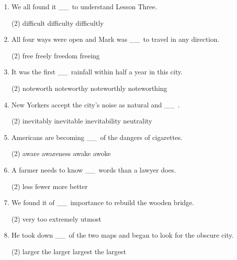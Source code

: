 \documentclass{yufa}
\newcommand\ttu{ \_\_\ }
\begin{document}
\begin{enumerate}
\item We all found it \ttu to understand Lesson Three.
  \begin{tasks}(2)
    \task difficult
    \task difficulty
    \task difficultly
  \end{tasks}

\item All four ways were open and Mark was \ttu to travel in any direction.
  \begin{tasks}(2)
    \task free
    \task freely
    \task freedom
    \task freeing
  \end{tasks}

\item It was the first \ttu rainfall within half a year in this city.
  \begin{tasks}(2)
    \task noteworth
    \task noteworthy
    \task noteworthly
    \task noteworthing
  \end{tasks}

\item New Yorkers accept the city's noise as natural and \ttu.
  \begin{tasks}(2)
    \task inevitably
    \task inevitable
    \task inevitability
    \task neutrality
  \end{tasks}

\item Americans are becoming \ttu of the dangers of cigarettes.
  \begin{tasks}(2)
    \task aware
    \task awareness
    \task awake
    \task awoke
  \end{tasks}

\item A farmer needs to know \ttu words than a lawyer does.
  \begin{tasks}(2)
    \task less
    \task fewer
    \task more
    \task better
  \end{tasks}

\item We found it of \ttu importance to rebuild the wooden bridge.
  \begin{tasks}(2)
    \task very
    \task too
    \task extremely
    \task utmost
  \end{tasks}

\item He took down \ttu of the two maps and began to look for the obscure city.
  \begin{tasks}(2)
    \task larger
    \task the larger
    \task largest
    \task the largest
  \end{tasks}


\end{enumerate}
\end{document}
